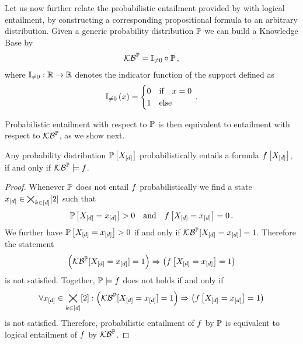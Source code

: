
Let us now further relate the probabilistic entailment provided by  with logical entailment, by constructing a corresponding propositional formula to an arbitrary distribution.
Given a generic probability distribution $\mathbb{P}$ we can build a Knowledge Base by
\begin{align*}
	 \mathcal{KB}^{\mathbb{P}} = \mathbb{I}_{\neq0} \circ \mathbb{P} \, ,
\end{align*}
where $\mathbb{I}_{\neq0}:\mathbb{R}\rightarrow \mathbb{R}$ denotes the indicator function of the support defined as
\begin{align}
	\mathbb{I}_{\neq0}\left(x\right) = \begin{cases}
	0 & \text{if} \quad x=0 \\
	1 & \text{else}
	\end{cases} \, .
\end{align}

Probabilistic entailment with respect to $\mathbb{P}$ is then equivalent to entailment with respect to $\mathcal{KB}^{\mathbb{P}}$, as we show next.

\begin{theorem}\label{the:entailmentProbToLogical}
	Any probability distribution $\mathbb{P}\left[X_{[d]}\right]$ probabilistically entails a formula $f\left[X_{[d]}\right]$, if and only if $\mathcal{KB}^{\mathbb{P}}\models f$.
\end{theorem}
\begin{proof}
	Whenever $\mathbb{P}$ does not entail $f$ probabilistically we find a state $x_{[d]}\in\bigtimes_{k\in[d]}[2]$ such that
	\begin{align*}
		 \mathbb{P}\left[X_{[d]}=x_{[d]}\right] >0 \quad\text{and} \quad f\left[X_{[d]}=x_{[d]}\right] = 0 \, .
	\end{align*}
	We further have $\mathbb{P}\left[X_{[d]}=x_{[d]}\right]>0$ if and only if $\mathcal{KB}^{\mathbb{P}}[X_{[d]}=x_{[d]}]=1$.
	Therefore the statement
	\begin{align*}
		\left(\mathcal{KB}^{\mathbb{P}}[X_{[d]}=x_{[d]}]=1\right)\Rightarrow\left(f\left[X_{[d]}=x_{[d]}\right]=1\right)
	\end{align*}
	is not satisfied.
	Together, $\mathbb{P}\models f$ does not holds if and only if
	\begin{align*}
		\forall{x_{[d]}\in\bigtimes_{k\in[d]}[2]}:{\left(\mathcal{KB}^{\mathbb{P}}[X_{[d]}=x_{[d]}]=1\right)\Rightarrow\left(f\left[X_{[d]}=x_{[d]}\right]=1\right)}
	\end{align*}
	is not satisfied. 
	Therefore, probabilistic entailment of $f$ by $\mathbb{P}$ is equivalent to logical entailment of $f$ by $\mathcal{KB}^{\mathbb{P}}$.
\end{proof}

